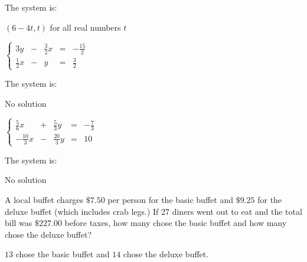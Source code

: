 \documentclass{ximera}
\begin{document}
\begin{question}
\begin{problem}
The system is:
\begin{multipleChoice}
\end{multipleChoice}


\begin{solution}
$\left(6-4t, t\right)$ for all real numbers $t$
\end{solution}
\end{problem}
   
\begin{problem}
$\left\{ \begin{array}{ccccr} 3y&-&\frac{3}{2}x & = & -\frac{15}{2}  \\  \frac{1}{2}x&-&y & = & \frac{3}{2} \end{array} \right.$


The system is:
\begin{multipleChoice}
\end{multipleChoice}

\begin{solution}
No solution
\end{solution}
\end{problem}

\begin{problem}\label{reviewsystemlast}
$\left\{ \begin{array}{ccccr} \frac{5}{6}x&+&\frac{5}{3}y & = & -\frac{7}{3}  \\  -\frac{10}{3}x&-&\frac{20}{3}y & = & 10  \end{array} \right.$


The system is:
\begin{multipleChoice}
\end{multipleChoice}



\begin{solution}
No solution
\end{solution}
\end{problem} 

\end{question}

\begin{problem}
A local buffet charges $\$7.50$ per person for the basic buffet and $\$9.25$ for the deluxe buffet (which includes crab legs.)  If 27 diners went out to eat and the total bill was $\$227.00$ before taxes, how many chose the basic buffet and how many chose the deluxe buffet?   

\begin{solution}
$13$ chose the basic buffet and $14$ chose the deluxe buffet.
\end{solution}
\end{problem} 
\end{document}
